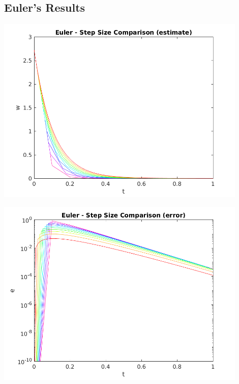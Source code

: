\documentclass{article}
\begin{document}





\subsection{Euler's Results}
\label{results:euler}

\begin{center}
  \includegraphics[width=0.9\textwidth]{../output/a_euler_h_val.png}
  \label{fig:a_euler_h_val}
\end{center}

\begin{center}
  \includegraphics[width=0.9\textwidth]{../output/a_euler_h_err.png}
  \label{fig:a_euler_h_err}
\end{center}
\end{document}

